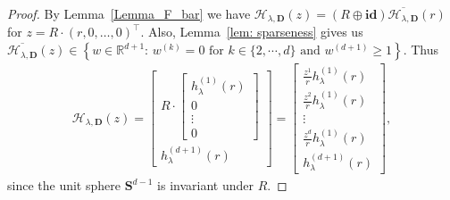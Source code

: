 \documentclass[10pt,a4paper]{amsart}
\newcommand{\sph}{{\mathbf{S}^{d-1}}}
\begin{document}
\begin{proof} By Lemma~\ref{Lemma_F_bar} we have $
{\mathcal{H}_{\lambda, \mathbf{D}}}(z) = \left(R \oplus \mathbf{id} \right) \overline{\mathcal{H}_{\lambda, \mathbf{D}}}(r)$ for $z =R\cdot(r,0,\ldots,0)^\top$. Also,  Lemma~\ref{lem: sparseness} gives us $
\overline{\mathcal{H}_{\lambda, \mathbf{D}}}(z) \in \left\{ w \in \mathbb{R}^{d+1}:\, w^{(k)} = 0\text{ for } k \in \{2, \cdots, d\} \text{ and }  w^{(d+1)}\geq 1\right\}.$ Thus
\begin{align*}
    {\mathcal{H}_{\lambda, \mathbf{D}}}(z) =\begin{bmatrix}
    R \cdot \begin{bmatrix}
    h_\lambda^{(1)}(r)\\
    0\\
    \vdots\\
    0
    \end{bmatrix} \\
 h_\lambda^{(d+1)}(r)
    \end{bmatrix} = \begin{bmatrix}
\frac{z^{1}}{r}h_{ \lambda}^{(1)}(r) \\\frac{z^{2}}{r}h_{ \lambda}^{(1)}(r)\\ \vdots \\\frac{z^{d}}{r}h_{ \lambda}^{(1)}(r)\\h^{(d+1)}_{\lambda}(r) \end{bmatrix},
\end{align*}
since the unit sphere $\sph$ is invariant under $R$.



\end{proof}
\end{document}
